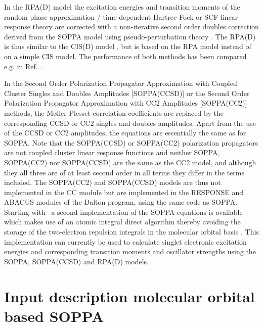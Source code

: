 In the RPA(D) model \cite{spas025} the excitation
energies and transition moments of the random phase approximation /
time-dependent Hartree-Fock or SCF linear response theory are corrected
with a non-iterative second order doubles correction derived from the
SOPPA model using pseudo-perturbation theory
\cite{Christiansen:PERTURBATIVE_TRIPLES}. The RPA(D) is thus similar to
the CIS(D) model \cite{Head-Gordon:94},
 but is based on the RPA model instead of on a simple CIS
model. The performance of both methods has been compared e.g. in Ref.
\cite{spas089}.

In the Second Order Polarization Propagator Approximation with Coupled
Cluster Singles and Doubles Amplitudes [SOPPA(CCSD)] \cite{soppaccsd,
ekdspasjpca102, tejospastcan100, ctocd, spas089}  or
the Second Order Polarization Propagator Approximation with CC2
Amplitudes [SOPPA(CC2)] \cite{spas097} methods, the
M{\o}ller-Plesset correlation coefficients are replaced by the
corresponding CCSD or CC2 singles and doubles amplitudes. Apart from
the use of the CCSD or CC2 amplitudes, the equations are essentially
the same as for SOPPA. Note that the SOPPA(CCSD) or SOPPA(CC2)
polarization propagators are not coupled cluster linear response
functions and neither SOPPA, SOPPA(CC2) nor SOPPA(CCSD) are the same as
the CC2 model, and although they all three are of at least second order
in all terms they differ in the terms included. The SOPPA(CC2) and
SOPPA(CCSD) models are thus not implemented in the CC module but are
implemented in the RESPONSE and ABACUS modules of the Dalton program,
using the same code as SOPPA. Starting with \dalton\ a second
implementation of the SOPPA equations is available which makes use of
an atomic integral direct algorithm thereby avoiding the storage of the
two-electron repulsion integrals in the molecular orbital basis
\cite{spas025, spas037, spas089}. This implementation can currently be
used to calculate singlet electronic excitation energies and
corresponding transition moments and oscillator strengths using the
SOPPA, SOPPA(CCSD) and RPA(D) models.


\section{Input description molecular orbital based SOPPA}\label{sec:soppainput}

